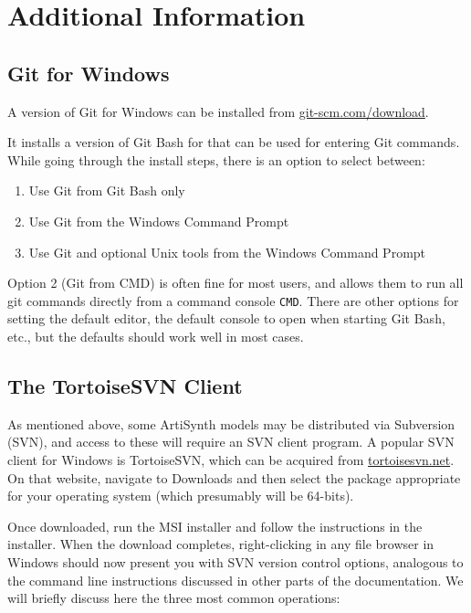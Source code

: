 \section{Additional Information}

\ifWindows

\subsection{Git for Windows}
\label{GitForWindows}

A version of Git for Windows can be installed from
\href{https://git-scm.com/download}{git-scm.com/download}.

It installs a version of Git Bash for that can be used for entering
Git commands.  While going through the install steps, there is an
option to select between:

\begin{enumerate}

\item Use Git from Git Bash only
\item Use Git from the Windows Command Prompt
\item Use Git and optional Unix tools from the Windows Command Prompt

\end{enumerate}

Option 2 (Git from CMD) is often fine for most users, and allows them
to run all git commands directly from a command console {\tt CMD}.  There are
other options for setting the default editor, the default
console to open when starting Git Bash, etc., but the defaults should
work well in most cases.

\subsection{The TortoiseSVN Client}
\label{TortoiseSVN}

As mentioned above, some ArtiSynth models may be distributed via
Subversion (SVN), and access to these will require an SVN client
program. A popular SVN client for Windows is TortoiseSVN, which can be
acquired from
\href{http://tortoisesvn.net}{tortoisesvn.net}. On that website,
navigate to {\sf Downloads} and then select the package appropriate
for your operating system (which presumably will be 64-bits).

Once downloaded, run the MSI installer and follow the instructions in
the installer. When the download completes, right-clicking in any file
browser in Windows should now present you with SVN version control
options, analogous to the command line instructions discussed in other
parts of the documentation. We will briefly discuss here the three
most common operations:


